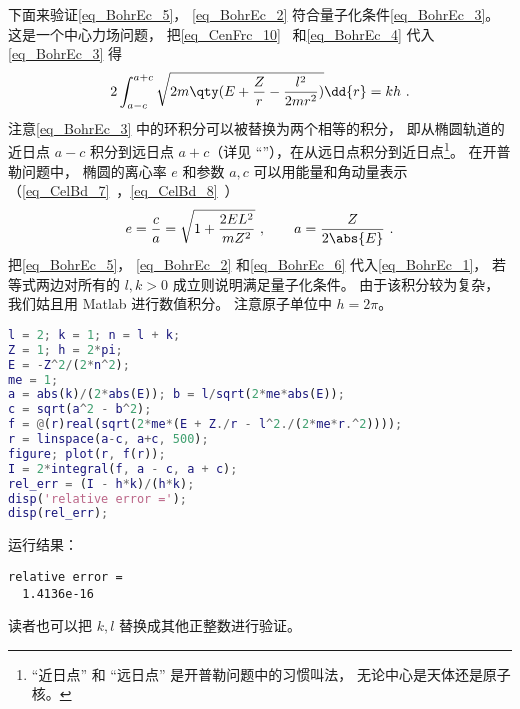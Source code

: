 下面来验证\autoref{eq_BohrEc_5}， \autoref{eq_BohrEc_2} 符合量子化条件\autoref{eq_BohrEc_3}。 这是一个中心力场问题， 把\autoref{eq_CenFrc_10}~ 和\autoref{eq_BohrEc_4}  代入\autoref{eq_BohrEc_3} 得
\begin{equation}\label{eq_BohrEc_1}
2\int_{a-c}^{a+c} \sqrt{2m\qty(E + \frac{Z}{r} - \frac{l^2}{2mr^2})} \dd{r} = kh~.
\end{equation}
注意\autoref{eq_BohrEc_3} 中的环积分可以被替换为两个相等的积分， 即从椭圆轨道的近日点 $a-c$ 积分到远日点 $a+c$（详见 “”），在从远日点积分到近日点\footnote{“近日点” 和 “远日点” 是开普勒问题中的习惯叫法， 无论中心是天体还是原子核。}。 在开普勒问题中， 椭圆的离心率 $e$ 和参数 $a, c$ 可以用能量和角动量表示（\autoref{eq_CelBd_7}~，\autoref{eq_CelBd_8}~）
\begin{equation}\label{eq_BohrEc_6}
e = \frac{c}{a} = \sqrt{1 + \frac{2EL^2}{mZ^2}}~,
\qquad
a = \frac{Z}{2\abs{E}}~.
\end{equation}
把\autoref{eq_BohrEc_5}， \autoref{eq_BohrEc_2} 和\autoref{eq_BohrEc_6} 代入\autoref{eq_BohrEc_1}， 若等式两边对所有的 $l,k > 0$ 成立则说明满足量子化条件。 由于该积分较为复杂， 我们姑且用 Matlab 进行数值积分。%
注意原子单位中 $h = 2\pi$。
\begin{lstlisting}[language=matlab]
l = 2; k = 1; n = l + k;
Z = 1; h = 2*pi;
E = -Z^2/(2*n^2);
me = 1;
a = abs(k)/(2*abs(E)); b = l/sqrt(2*me*abs(E));
c = sqrt(a^2 - b^2);
f = @(r)real(sqrt(2*me*(E + Z./r - l^2./(2*me*r.^2))));
r = linspace(a-c, a+c, 500);
figure; plot(r, f(r));
I = 2*integral(f, a - c, a + c);
rel_err = (I - h*k)/(h*k);
disp('relative error =');
disp(rel_err);
\end{lstlisting}
运行结果： 
\begin{lstlisting}[language=matlabC]
relative error =
  1.4136e-16
\end{lstlisting}
读者也可以把 $k, l$ 替换成其他正整数进行验证。
